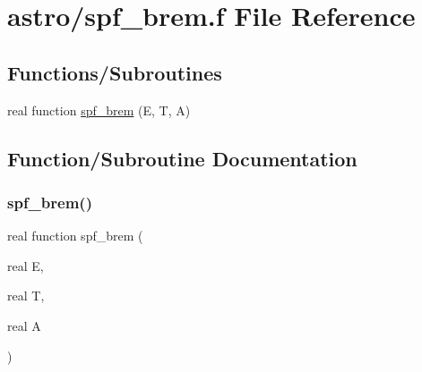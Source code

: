 \hypertarget{spf__brem_8f}{}\section{astro/spf\+\_\+brem.f File Reference}
\label{spf__brem_8f}
\subsection*{Functions/\+Subroutines}
\begin{DoxyCompactItemize}
\item 
real function \hyperlink{spf__brem_8f_a745a5103255472fcc65fadec7df7727d}{spf\+\_\+brem} (E, T, A)
\end{DoxyCompactItemize}


\subsection{Function/\+Subroutine Documentation}
\mbox{\label{spf__brem_8f_a745a5103255472fcc65fadec7df7727d}} 
\subsubsection{\texorpdfstring{spf\+\_\+brem()}{spf\_brem()}}
{\footnotesize\ttfamily real function spf\+\_\+brem (\begin{DoxyParamCaption}\item[{real}]{E,  }\item[{real}]{T,  }\item[{real}]{A }\end{DoxyParamCaption})}

